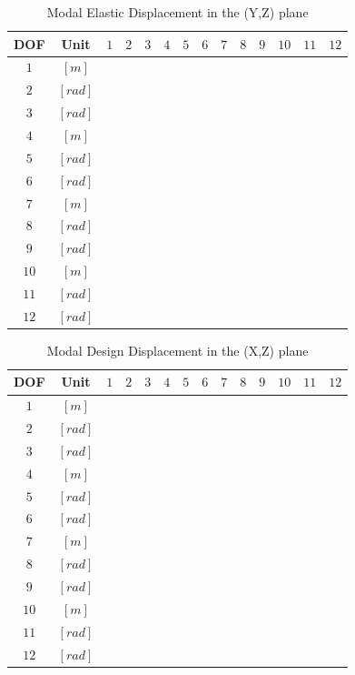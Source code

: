\documentclass[11pt,a4paper,titlepage]{report}
\begin{document}
\begin{table}[h]
    \centering
    \begin{tabular}{c|c|c|c|c|c|c|c|c|c|c|c|c|c}
        DOF & Unit & $1$ & $2$ & $3$ & $4$ & $5$ & $6$ & $7$ & $8$ & $9$ & $10$ & $11$ & $12$\\
        \hline 
        $1$ & $[m]$ & & & & & & & & & & & \\
        $2$ & $[rad]$ & & & & & & & & & & & \\
        $3$ & $[rad]$ & & & & & & & & & & & \\
        $4$ & $[m]$ & & & & & & & & & & & \\
        $5$ & $[rad]$ & & & & & & & & & & & \\
        $6$ & $[rad]$ & & & & & & & & & & & \\
        $7$ & $[m]$ & & & & & & & & & & & \\
        $8$ & $[rad]$ & & & & & & & & & & & \\
        $9$ & $[rad]$ & & & & & & & & & & & \\
        $10$ & $[m]$ & & & & & & & & & & & \\
        $11$ & $[rad]$ & & & & & & & & & & & \\
        $12$ & $[rad]$ & & & & & & & & & & & \\
    \end{tabular}
    \caption{Modal Elastic Displacement in the (Y,Z) plane}
    \label{tab:my_label}
\end{table}
\begin{table}[h]
    \centering
    \begin{tabular}{c|c|c|c|c|c|c|c|c|c|c|c|c|c}
        DOF & Unit & $1$ & $2$ & $3$ & $4$ & $5$ & $6$ & $7$ & $8$ & $9$ & $10$ & $11$ & $12$\\
        \hline 
        $1$ & $[m]$ & & & & & & & & & & & \\
        $2$ & $[rad]$ & & & & & & & & & & & \\
        $3$ & $[rad]$ & & & & & & & & & & & \\
        $4$ & $[m]$ & & & & & & & & & & & \\
        $5$ & $[rad]$ & & & & & & & & & & & \\
        $6$ & $[rad]$ & & & & & & & & & & & \\
        $7$ & $[m]$ & & & & & & & & & & & \\
        $8$ & $[rad]$ & & & & & & & & & & & \\
        $9$ & $[rad]$ & & & & & & & & & & & \\
        $10$ & $[m]$ & & & & & & & & & & & \\
        $11$ & $[rad]$ & & & & & & & & & & & \\
        $12$ & $[rad]$ & & & & & & & & & & & \\
    \end{tabular}
    \caption{Modal Design Displacement in the (X,Z) plane}
    \label{tab:my_label}
\end{table}
\end{document}
